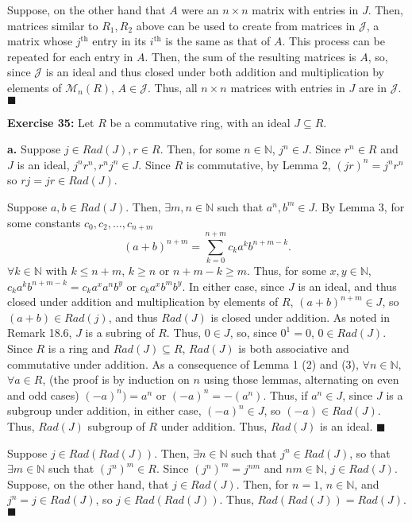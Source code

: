 \documentclass{article}%
\begin{document}
Suppose, on the other hand that $A$ were an $n \times n$ matrix with entries
in $J$. Then, matrices similar to $R_1,R_2$ above can be used to create
from matrices in $\mathcal{J}$, a matrix whose $j^{\mbox{th}}$ entry in its
$i^{\mbox{th}}$ is the same as that of $A$. This process can be repeated for
each entry in $A$. Then, the sum of the resulting matrices is $A$, so, since
$\mathcal{J}$ is an ideal and thus closed under both addition and
multiplication by elements of $\mathcal{M}_n(R)$, $A \in \mathcal{J}$. Thus,
all $n \times n$ matrices with entries in $J$ are in $\mathcal{J}$. \qquad
$\blacksquare$

\textbf{Exercise 35:} Let $R$ be a commutative ring, with an ideal
$J \subseteq R$.

\textbf{a.}
Suppose $j \in Rad(J), r \in R$. Then, for some $n \in \mathbb{N}$, $j^n \in
J$. Since $r^n \in R$ and $J$ is an ideal, $j^nr^n, r^nj^n\in J$. Since $R$ is
commutative, by Lemma 2, $(jr)^n = j^nr^n$ so $rj = jr \in Rad(J)$.

Suppose $a,b \in Rad(J)$. Then, $\exists m,n \in \mathbb{N}$ such that
$a^n,b^m \in J$. By Lemma 3, for some constants $c_0,c_2,\ldots,c_{n+m}$
\[(a + b)^{n + m} = \sum_{k = 0}^{n + m} c_k a^kb^{n + m - k}.\]
$\forall k \in \mathbb{N}$ with $k \leq n + m$, $k \geq n$ or
$n + m - k \geq m$. Thus, for some $x,y \in \mathbb{N}$,
$c_k a^kb^{n + m - k} = c_k a^xa^nb^y$ or $c_k a^xb^mb^y$. In either case,
since $J$ is an ideal, and thus closed under addition and multiplication by
elements of $R$, $(a + b)^{n + m} \in J$, so $(a + b) \in Rad(j)$, and thus
$Rad(J)$ is closed under addition.
As noted in Remark 18.6, $J$ is a subring of $R$. Thus, $0 \in J$,
so, since $0^1 = 0$, $0 \in Rad(J)$. Since $R$ is a ring and $Rad(J) \subseteq
R$, $Rad(J)$ is both associative and commutative under addition. As a
consequence of Lemma 1 (2) and (3), $\forall n \in \mathbb{N}$, $\forall a \in
R$, (the proof is by induction on $n$ using those lemmas, alternating on even
and odd cases) $(-a)^n) = a^n$ or $(-a)^n = -(a^n)$. Thus, if $a^n \in J$,
since $J$ is a subgroup under addition, in either case, $(-a)^n \in J$, so
$(-a) \in Rad(J)$. Thus, $Rad(J)$ subgroup of $R$ under addition. Thus,
$Rad(J)$ is an ideal. \qquad $\blacksquare$

Suppose $j \in Rad(Rad(J))$. Then, $\exists n \in \mathbb{N}$ such that $j^n
\in Rad(J)$, so that $\exists m \in \mathbb{N}$ such that $(j^n)^m \in R$.
Since $(j^n)^m = j^{nm}$ and $nm \in \mathbb{N}$, $j \in Rad(J)$.
Suppose, on the other hand, that $j \in Rad(J)$. Then, for $n = 1$, $n \in
\mathbb{N}$, and $j^n = j \in Rad(J)$, so $j \in Rad(Rad(J))$. Thus,
$Rad(Rad(J)) = Rad(J)$. \qquad $\blacksquare$ \\
\end{document}
